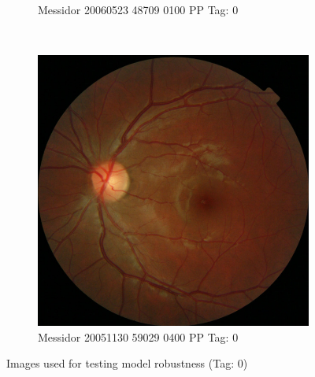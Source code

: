 \begin{figure}[ht!]
\begin{subfigure}[b]{0.4\textwidth}
		\caption{Messidor 20060523 48709 0100 PP Tag: 0}		
	\end{subfigure} ~
	\begin{subfigure}[b]{0.4\textwidth}
		\centering
		\includegraphics[width=\textwidth]{Figures/chapter_stability/20051130_59029_0400_PP/20051130_59029_0400_PP.jpeg}
		\caption{Messidor 20051130 59029 0400 PP Tag: 0}		
	\end{subfigure}
	\hfill 
	\caption{Images used for testing model robustness (Tag: 0)}  
	\label{sta:fig:imgs0} 
\end{figure}


